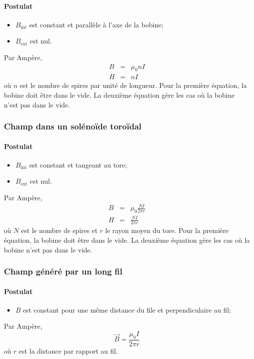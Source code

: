\documentclass[11pt,a4paper]{article}
\newcommand{\B}{\vec B}
\begin{document}
\paragraph{Postulat}
\begin{itemize}
	\item $B_\mathrm{int}$ est constant et parallèle à l'axe de la bobine;
	\item $B_\mathrm{ext}$ est nul.
\end{itemize}
Par Ampère,
\begin{eqnarray*}
	B &=& \mu_0nI\\
	H &=& nI
\end{eqnarray*}
où $n$ est le nombre de spires par unité de longueur.
Pour la première équation, la bobine doit être dans le vide.
La deuxième équation gère les cas où la bobine n'est pas dans le vide.

\subsubsection{Champ dans un solénoïde toroïdal}
\label{sec:bst}
\paragraph{Postulat}
\begin{itemize}
	\item $B_\mathrm{int}$ est constant et tangeant au tore;
	\item $B_\mathrm{ext}$ est nul.
\end{itemize}
Par Ampère,
\begin{eqnarray*}
	B &=& \mu_0\frac{NI}{2\pi r}\\
	H &=& \frac{NI}{2\pi r}
\end{eqnarray*}
où $N$ est le nombre de spires et $r$ le rayon moyen du tore.
Pour la première équation, la bobine doit être dans le vide.
La deuxième équation gère les cas où la bobine n'est pas dans le vide.

\subsubsection{Champ généré par un long fil}
\paragraph{Postulat}
\begin{itemize}
	\item $B$ est constant pour une même distance du file et perpendiculaire au fil;
\end{itemize}
Par Ampère,
\[ \B = \frac{\mu_0I}{2\pi r} \]
où $r$ est la distance par rapport au fil.
\end{document}
